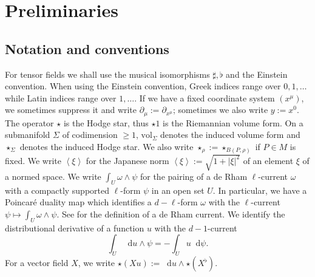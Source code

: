 \documentclass[reqno,10pt]{amsart}
\newcommand*\dif{\mathop{}\!\mathrm{d}}
\newcommand{\vol}{\mathrm{vol}}
\def\Japan#1{\left \langle #1 \right \rangle}
\theoremstyle{definition}
\numberwithin{equation}{section}
\begin{document}
\section{Preliminaries}\label{prelims}
\subsection{Notation and conventions}
For tensor fields we shall use the musical isomorphisms $\sharp, \flat$ and the Einstein convention.
When using the Einstein convention, Greek indices range over $0, 1, \dots$ while Latin indices range over $1, \dots$.
If we have a fixed coordinate system $(x^\mu)$, we sometimes suppress it and write $\partial_\mu := \partial_{x^\mu}$; sometimes we also write $y := x^0$.
The operator $\star$ is the Hodge star, thus $\star 1$ is the Riemannian volume form.
On a submanifold $\Sigma$ of codimension $\geq 1$, $\vol_\Sigma$ denotes the induced volume form and $\star_\Sigma$ denotes the induced Hodge star. We also write $\star_\rho := \star_{B(P, \rho)}$ if $P \in M$ is fixed.
We write $\Japan\xi$ for the Japanese norm $\Japan\xi := \sqrt{1 + |\xi|^2}$
of an element $\xi$ of a normed space.
We write $\int_U \omega \wedge \psi$ for the pairing of a de Rham $\ell$-current $\omega$ with a compactly supported $\ell$-form $\psi$ in an open set $U$.
In particular, we have a Poincar\'e duality map which identifies a $d - \ell$-form $\omega$ with the $\ell$-current $\psi \mapsto \int_U \omega \wedge \psi$.
See \cite{simon1983GMT} for the definition of a de Rham current.
We identify the distributional derivative of a function $u$ with the $d-1$-current
$$\int_U \dif u \wedge \psi = -\int_U u \dif \psi.$$
For a vector field $X$, we write $\star (Xu) := \dif u \wedge \star (X^\flat)$.


\end{document}
